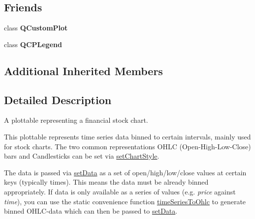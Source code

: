 \subsection*{Friends}
\begin{DoxyCompactItemize}
\item 
\mbox{\label{classQCPFinancial_a1cdf9df76adcfae45261690aa0ca2198}} 
class {\bfseries Q\+Custom\+Plot}
\item 
\mbox{\label{classQCPFinancial_a8429035e7adfbd7f05805a6530ad5e3b}} 
class {\bfseries Q\+C\+P\+Legend}
\end{DoxyCompactItemize}
\subsection*{Additional Inherited Members}


\subsection{Detailed Description}
A plottable representing a financial stock chart. 



This plottable represents time series data binned to certain intervals, mainly used for stock charts. The two common representations O\+H\+LC (Open-\/\+High-\/\+Low-\/\+Close) bars and Candlesticks can be set via \hyperlink{classQCPFinancial_a5a59175d36279d71596e64d7bb65596f}{set\+Chart\+Style}.

The data is passed via \hyperlink{classQCPFinancial_a72089e75b8a50d18097526c3c79fdb85}{set\+Data} as a set of open/high/low/close values at certain keys (typically times). This means the data must be already binned appropriately. If data is only available as a series of values (e.\+g. {\itshape price} against {\itshape time}), you can use the static convenience function \hyperlink{classQCPFinancial_a9a058c035040d3939b8884f4aaccb1a7}{time\+Series\+To\+Ohlc} to generate binned O\+H\+L\+C-\/data which can then be passed to \hyperlink{classQCPFinancial_a72089e75b8a50d18097526c3c79fdb85}{set\+Data}.

